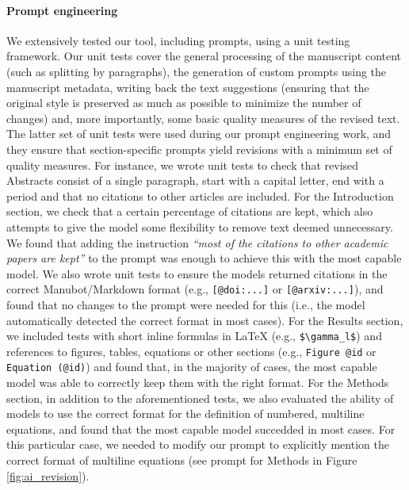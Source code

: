 \documentclass[
]{article}
\begin{document}
\hypertarget{prompt-engineering}{%
\paragraph{Prompt engineering}\label{prompt-engineering}}

We extensively tested our tool, including prompts, using a unit testing framework.
Our unit tests cover the general processing of the manuscript content (such as splitting by paragraphs), the generation of custom prompts using the manuscript metadata, writing back the text suggestions (ensuring that the original style is preserved as much as possible to minimize the number of changes) and, more importantly, some basic quality measures of the revised text.
The latter set of unit tests were used during our prompt engineering work, and they ensure that section-specific prompts yield revisions with a minimum set of quality measures.
For instance, we wrote unit tests to check that revised Abstracts consist of a single paragraph, start with a capital letter, end with a period and that no citations to other articles are included.
For the Introduction section, we check that a certain percentage of citations are kept, which also attempts to give the model some flexibility to remove text deemed unnecessary.
We found that adding the instruction \emph{``most of the citations to other academic papers are kept''} to the prompt was enough to achieve this with the most capable model.
We also wrote unit tests to ensure the models returned citations in the correct Manubot/Markdown format (e.g., \texttt{{[}@doi:...{]}} or \texttt{{[}@arxiv:...{]}}), and found that no changes to the prompt were needed for this (i.e., the model automatically detected the correct format in most cases).
For the Results section, we included tests with short inline formulas in LaTeX (e.g., \texttt{\$\textbackslash{}gamma\_l\$}) and references to figures, tables, equations or other sections (e.g., \texttt{Figure\ @id} or \texttt{Equation\ (@id)}) and found that, in the majority of cases, the most capable model was able to correctly keep them with the right format.
For the Methods section, in addition to the aforementioned tests, we also evaluated the ability of models to use the correct format for the definition of numbered, multiline equations, and found that the most capable model succedded in most cases.
For this particular case, we needed to modify our prompt to explicitly mention the correct format of multiline equations (see prompt for Methods in Figure \ref{fig:ai_revision}).
\end{document}
